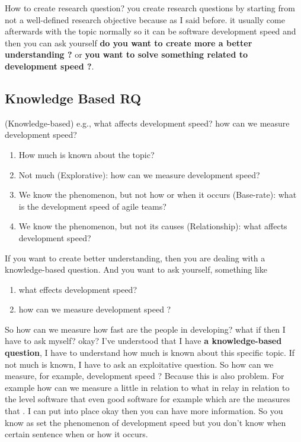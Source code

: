 \documentclass[conference, compsoc, twoside]{IEEEtran}
\begin{document}
How to create research question? you create research questions by starting from not a well-defined research objective because as I said before. 
it usually come afterwards with the topic normally so it can be software development speed and then you can ask yourself \textbf{do you want to create more a better understanding ?} or 
\textbf{you want to solve something related to development speed ?}.

\subsection{Knowledge Based RQ} %
(Knowledge-based) e.g., what affects development speed? how can we measure development speed?
\begin{enumerate}
	\item How much is known about the topic?
	\item Not much (Explorative): how can we measure development speed?
	\item We know the phenomenon, but not how or when it occurs (Base-rate): what is the
	development speed of agile teams?
	\item We know the phenomenon, but not its causes (Relationship): what affects development
	speed?
\end{enumerate}

If you want to create better understanding, then you are dealing with a knowledge-based question.
And you want to ask yourself, something like 
\begin{enumerate}
	\item what effects development speed? 
	\item how can we measure development speed ?
\end{enumerate}

So how can we measure how fast are the people in developing?
what if then I have to ask myself? okay? 
I've understood that I have \textbf{a knowledge-based question},
I have to understand how much is known about this specific topic.
If not much is known, I have to ask an exploitative question. 
So how can we measure, for example, development speed ?
Because this is also problem. 
For example how can we measure a little in relation to what in relay in relation to the level software that even good software for example which are the measures that .
I can put into place okay then you can have more information.
So you know as set the phenomenon of development speed but you don't know when certain sentence when or how it occurs. 
\end{document}

